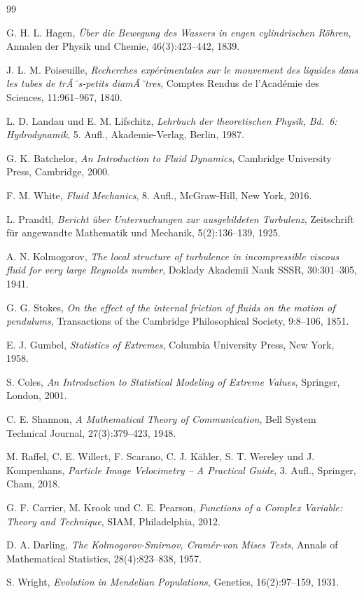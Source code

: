 ﻿\documentclass[a4paper,12pt]{article}
\theoremstyle{definition}
\begin{document}
\begin{thebibliography}{99}

G. H. L. Hagen,
\textit{Über die Bewegung des Wassers in engen cylindrischen Röhren},
Annalen der Physik und Chemie, 46(3):423--442, 1839.

J. L. M. Poiseuille,
\textit{Recherches expérimentales sur le mouvement des liquides dans les tubes de trÃ¨s-petits diamÃ¨tres},
Comptes Rendus de l'Académie des Sciences, 11:961--967, 1840.

L. D. Landau und E. M. Lifschitz,
\textit{Lehrbuch der theoretischen Physik, Bd.~6: Hydrodynamik},
5. Aufl., Akademie-Verlag, Berlin, 1987.

G. K. Batchelor,
\textit{An Introduction to Fluid Dynamics},
Cambridge University Press, Cambridge, 2000.

F. M. White,
\textit{Fluid Mechanics},
8. Aufl., McGraw-Hill, New York, 2016.

L. Prandtl,
\textit{Bericht über Untersuchungen zur ausgebildeten Turbulenz},
Zeitschrift für angewandte Mathematik und Mechanik, 5(2):136--139, 1925.

A. N. Kolmogorov,
\textit{The local structure of turbulence in incompressible viscous fluid for very large Reynolds number},
Doklady Akademii Nauk SSSR, 30:301--305, 1941.

G. G. Stokes,
\textit{On the effect of the internal friction of fluids on the motion of pendulums},
Transactions of the Cambridge Philosophical Society, 9:8--106, 1851.

E. J. Gumbel,
\textit{Statistics of Extremes},
Columbia University Press, New York, 1958.

S. Coles,
\textit{An Introduction to Statistical Modeling of Extreme Values},
Springer, London, 2001.

C. E. Shannon,
\textit{A Mathematical Theory of Communication},
Bell System Technical Journal, 27(3):379--423, 1948.

M. Raffel, C. E. Willert, F. Scarano, C. J. Kähler, S. T. Wereley und J. Kompenhans,
\textit{Particle Image Velocimetry -- A Practical Guide},
3. Aufl., Springer, Cham, 2018.

G. F. Carrier, M. Krook und C. E. Pearson,
\textit{Functions of a Complex Variable: Theory and Technique},
SIAM, Philadelphia, 2012.

D. A. Darling,
\textit{The Kolmogorov-Smirnov, Cramér-von Mises Tests},
Annals of Mathematical Statistics, 28(4):823--838, 1957.

S. Wright,
\textit{Evolution in Mendelian Populations},
Genetics, 16(2):97--159, 1931.

\end{thebibliography}
\end{document}
